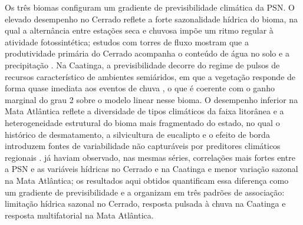 \documentclass[a4paper,fleqn]{cas-dc}
\begin{document}
Os três biomas configuram um gradiente de previsibilidade climática da PSN. O elevado desempenho no Cerrado reflete a forte sazonalidade hídrica do bioma, na qual a alternância entre estações seca e chuvosa impõe um ritmo regular à atividade fotossintética; estudos com torres de fluxo mostram que a produtividade primária do Cerrado acompanha o conteúdo de água no solo e a precipitação \citep{arruda2016,biudes2021,vourlitis2022}. Na Caatinga, a previsibilidade decorre do regime de pulsos de recursos característico de ambientes semiáridos, em que a vegetação responde de forma quase imediata aos eventos de chuva \citep{schwinning2004,mendes2025,silva2026}, o que é coerente com o ganho marginal do grau 2 sobre o modelo linear nesse bioma. O desempenho inferior na Mata Atlântica reflete a diversidade de tipos climáticos da faixa litorânea \citep{alvares2013} e a heterogeneidade estrutural do bioma mais fragmentado do estado, no qual o histórico de desmatamento, a silvicultura de eucalipto e o efeito de borda introduzem fontes de variabilidade não capturáveis por preditores climáticos regionais \citep{lima2020,broggio2024}. \citet{benfica2023} já haviam observado, nas mesmas séries, correlações mais fortes entre a PSN e as variáveis hídricas no Cerrado e na Caatinga e menor variação sazonal na Mata Atlântica; os resultados aqui obtidos quantificam essa diferença como um gradiente de previsibilidade e a organizam em três padrões de associação: limitação hídrica sazonal no Cerrado, resposta pulsada à chuva na Caatinga e resposta multifatorial na Mata Atlântica.
\end{document}
